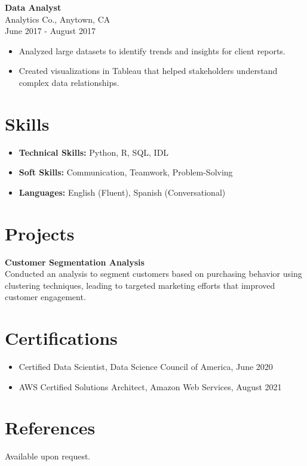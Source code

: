 \documentclass[a4paper,10pt]{article}
\begin{document}
\textbf{Data Analyst} \\
Analytics Co., Anytown, CA \\
June 2017 - August 2017 \\
\begin{itemize}[left=0pt]
    \item Analyzed large datasets to identify trends and insights for client reports.
    \item Created visualizations in Tableau that helped stakeholders understand complex data relationships.
\end{itemize}

\section*{Skills}
\begin{itemize}[left=0pt]
    \item \textbf{Technical Skills:} Python, R, SQL, IDL
    \item \textbf{Soft Skills:} Communication, Teamwork, Problem-Solving
    \item \textbf{Languages:} English (Fluent), Spanish (Conversational)
\end{itemize}

\section*{Projects}
\textbf{Customer Segmentation Analysis} \\
Conducted an analysis to segment customers based on purchasing behavior using clustering techniques, leading to targeted marketing efforts that improved customer engagement.

\section*{Certifications}
\begin{itemize}[left=0pt]
    \item Certified Data Scientist, Data Science Council of America, June 2020
    \item AWS Certified Solutions Architect, Amazon Web Services, August 2021
\end{itemize}

\section*{References}
Available upon request.
\end{document}
